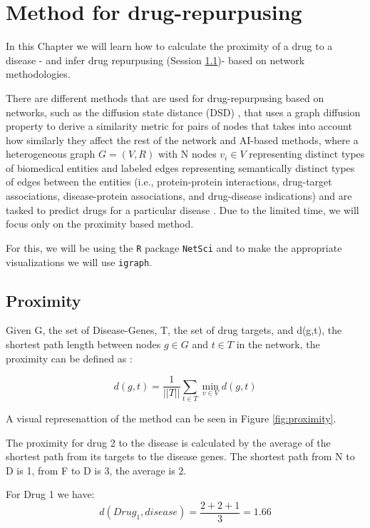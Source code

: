 \documentclass[
]{book}
\begin{document}
\hypertarget{method-for-drug-repurpusing}{%
\chapter{Method for drug-repurpusing}\label{method-for-drug-repurpusing}}

In this Chapter we will learn how to calculate the proximity of a drug to a disease - and infer drug repurpusing (Session \ref{proximity})- based on network methodologies.

There are different methods that are used for drug-repurpusing based on networks, such as the diffusion state distance (DSD) \citep{Cao2013}, that uses a graph diffusion property to derive a similarity metric for pairs of nodes that takes into account how similarly they affect the rest of the network and AI-based methods, where a heterogeneous graph \(G = (V,R)\) with N nodes \(v_i \in V\) representing distinct types of biomedical entities and labeled edges representing semantically distinct types of edges between the entities (i.e., protein-protein interactions, drug-target associations, disease-protein associations, and drug-disease indications) and are tasked to predict drugs for a particular disease \citep{Zitnik2018}. Due to the limited time, we will focus only on the proximity based method.

For this, we will be using the \texttt{R} package \texttt{NetSci} and to make the appropriate visualizations we will use \texttt{igraph}.

\hypertarget{proximity}{%
\section{Proximity}\label{proximity}}

Given G, the set of Disease-Genes, T, the set of drug targets, and d(g,t), the shortest path length between nodes \(g \in G\) and \(t \in T\) in the network, the proximity can be defined as \citep{Guney2016}:

\[ 
d(g,t)  = \frac{1}{|\left|T\right||}\sum_{t\in T}\underset{v\in V}\min{d(g,t)}
\]

A visual represenattion of the method can be seen in Figure \ref{fig:proximity}.

The proximity for drug 2 to the disease is calculated by the average of the shortest path from its targets to the disease genes. The shortest path from N to D is 1, from F to D is 3, the average is 2.

For Drug 1 we have: \[d(Drug_1, disease) = \frac{2 + 2 + 1}{3} = 1.66\]
\end{document}
